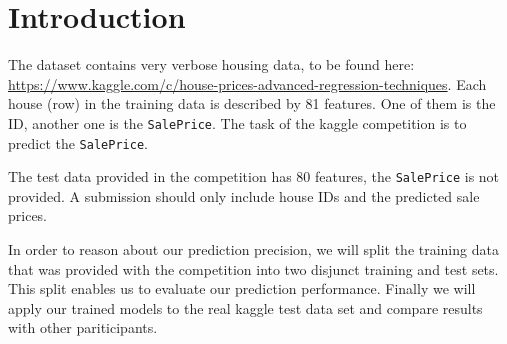 \section{Introduction}

The dataset contains very verbose housing data, to be found here: \url{https://www.kaggle.com/c/house-prices-advanced-regression-techniques}. Each house (row) in the training data is described by 81 features. One of them is the ID, another one is the \texttt{SalePrice}. The task of the kaggle competition is to predict the \texttt{SalePrice}.

The test data provided in the competition has 80 features, the \texttt{SalePrice} is not provided. A submission should only include house IDs and the predicted sale prices.

In order to reason about our prediction precision, we will split the training data that was provided with the competition into two disjunct training and test sets. This split enables us to evaluate our prediction performance. Finally we will apply our trained models to the real kaggle test data set and compare results with other pariticipants.